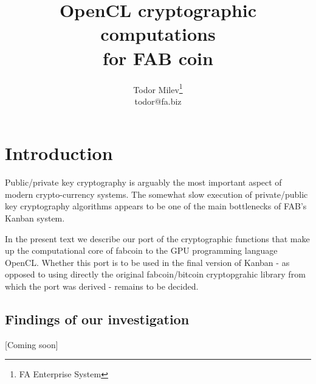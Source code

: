 \documentclass{article}
\title{
OpenCL cryptographic computations \\
for FAB coin
}
\author{Todor Milev\footnote{FA Enterprise System}\\ todor@fa.biz}
\begin{document}
\maketitle
\section{Introduction}
Public/private key cryptography is arguably the most important aspect of modern crypto-currency systems. The somewhat slow execution of private/public key cryptography algorithms appears to be one of the main bottlenecks of FAB's Kanban system. 

In the present text we describe our port of the cryptographic functions that make up the computational core of fabcoin to the GPU programming language OpenCL. Whether this port is to be used in the final version of Kanban - as opposed to using directly the original fabcoin/bitcoin cryptopgrahic library from which the port was derived - remains to be decided.

\subsection{Findings of our investigation}
[Coming soon]



\end{document}
